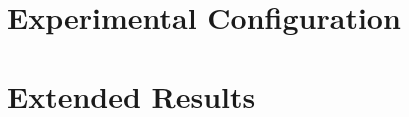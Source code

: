 \section{Experimental Configuration}
\label{sec:apx:config}

\section{Extended Results}
\label{sec:apx:results}

